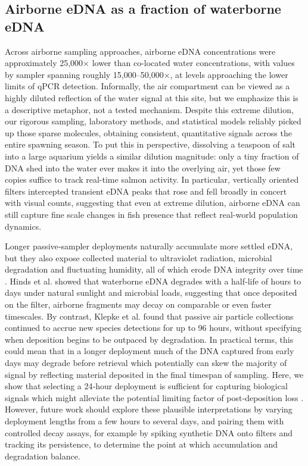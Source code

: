 \documentclass{article}
\begin{document}
\subsection{Airborne eDNA as a fraction of waterborne eDNA}
Across airborne sampling approaches, airborne eDNA concentrations were approximately 25,000× lower than co-located water concentrations, with values by sampler spanning roughly 15,000–50,000×,  at levels approaching the lower limits of qPCR detection. Informally, the air compartment can be viewed as a highly diluted reflection of the water signal at this site, but we emphasize this is a descriptive metaphor, not a tested mechanism. Despite this extreme dilution, our rigorous sampling, laboratory methods, and statistical models reliably picked up those sparse molecules, obtaining consistent, quantitative signals across the entire spawning season. To put this in perspective, dissolving a teaspoon of salt into a large aquarium yields a similar dilution magnitude: only a tiny fraction of DNA shed into the water ever makes it into the overlying air, yet those few copies suffice to track real-time salmon activity. In particular, vertically oriented filters intercepted transient eDNA peaks that rose and fell broadly in concert with visual counts, suggesting that even at extreme dilution, airborne eDNA can still capture fine scale changes in fish presence that reflect real-world population dynamics.

Longer passive‐sampler deployments naturally accumulate more settled eDNA, but they also expose collected material to ultraviolet radiation, microbial degradation and fluctuating humidity, all of which erode DNA integrity over time \cite{brandao-dias2023}. Hinds et al. \cite{strickler2015} showed that waterborne eDNA degrades with a half‐life of hours to days under natural sunlight and microbial loads, suggesting that once deposited on the filter, airborne fragments may decay on comparable or even faster timescales. By contrast, Klepke et al. \cite{klepke2022} found that passive air particle collections continued to accrue new species detections for up to 96 hours, without specifying when deposition begins to be outpaced by degradation. In practical terms, this could mean that in a longer deployment much of the DNA captured from early days may degrade before retrieval which potentially can skew the majority of signal by reflecting material deposited in the final timespan of sampling. Here, we show that selecting a 24‐hour deployment is sufficient for capturing biological signals which might alleviate the potential limiting factor of post‐deposition loss \cite{johnson2023}. However, future work should explore these plausible interpretations by varying deployment lengths from a few hours to several days, and pairing them with controlled decay assays, for example by spiking synthetic DNA onto filters and tracking its persistence, to determine the point at which accumulation and degradation balance.
\end{document}
